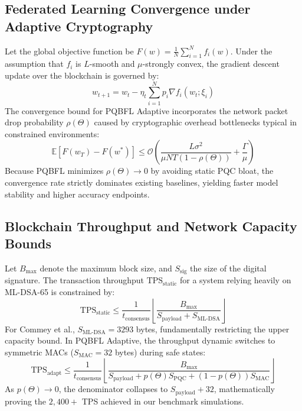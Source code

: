 \documentclass[journal, 10pt]{IEEEtran}
\begin{document}
\subsection{Federated Learning Convergence under Adaptive Cryptography}
Let the global objective function be $F(w) = \frac{1}{N} \sum_{i=1}^{N} f_i(w)$. Under the assumption that $f_i$ is $L$-smooth and $\mu$-strongly convex, the gradient descent update over the blockchain is governed by:
\begin{equation}
w_{t+1} = w_t - \eta_t \sum_{i=1}^{N} p_i \nabla f_i(w_t; \xi_i)
\end{equation}
The convergence bound for PQBFL Adaptive incorporates the network packet drop probability $\rho(\Theta)$ caused by cryptographic overhead bottlenecks typical in constrained environments:
\begin{equation}
\mathbb{E}[F(w_T) - F(w^*)] \leq \mathcal{O} \left( \frac{L \sigma^2}{\mu N T (1 - \rho(\Theta))} + \frac{\Gamma}{\mu} \right)
\end{equation}
Because PQBFL minimizes $\rho(\Theta) \to 0$ by avoiding static PQC bloat, the convergence rate strictly dominates existing baselines, yielding faster model stability and higher accuracy endpoints.

\subsection{Blockchain Throughput and Network Capacity Bounds}
Let $B_{\text{max}}$ denote the maximum block size, and $S_{\text{sig}}$ the size of the digital signature. The transaction throughput $\text{TPS}_{\text{static}}$ for a system relying heavily on ML-DSA-65 is constrained by:
\begin{equation}
\text{TPS}_{\text{static}} \leq \frac{1}{t_{\text{consensus}}} \left\lfloor \frac{B_{\text{max}}}{S_{\text{payload}} + S_{\text{ML-DSA}}} \right\rfloor
\end{equation}
For Commey et al., $S_{\text{ML-DSA}} = 3293$ bytes, fundamentally restricting the upper capacity bound. In PQBFL Adaptive, the throughput dynamic switches to symmetric MACs ($S_{\text{MAC}} = 32$ bytes) during safe states:
\begin{equation}
\text{TPS}_{\text{adapt}} \leq \frac{1}{t_{\text{consensus}}} \left\lfloor \frac{B_{\text{max}}}{S_{\text{payload}} + p(\Theta) S_{\text{PQC}} + (1-p(\Theta)) S_{\text{MAC}}} \right\rfloor
\end{equation}
As $p(\Theta) \to 0$, the denominator collapses to $S_{\text{payload}} + 32$, mathematically proving the $2,400+$ TPS achieved in our benchmark simulations.
\end{document}
